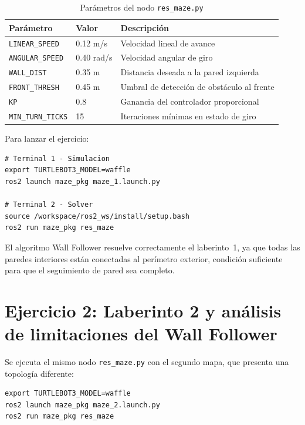 \begin{table}[H]
\centering
\begin{tabular}{lll}
\toprule
\textbf{Parámetro}      & \textbf{Valor} & \textbf{Descripción} \\
\midrule
\texttt{LINEAR\_SPEED}  & 0.12 m/s  & Velocidad lineal de avance \\
\texttt{ANGULAR\_SPEED} & 0.40 rad/s & Velocidad angular de giro \\
\texttt{WALL\_DIST}     & 0.35 m    & Distancia deseada a la pared izquierda \\
\texttt{FRONT\_THRESH}  & 0.45 m    & Umbral de detección de obstáculo al frente \\
\texttt{KP}             & 0.8       & Ganancia del controlador proporcional \\
\texttt{MIN\_TURN\_TICKS} & 15      & Iteraciones mínimas en estado de giro \\
\bottomrule
\end{tabular}
\caption{Parámetros del nodo \texttt{res\_maze.py}}
\end{table}

Para lanzar el ejercicio:

\begin{lstlisting}[style=bash]
# Terminal 1 - Simulacion
export TURTLEBOT3_MODEL=waffle
ros2 launch maze_pkg maze_1.launch.py

# Terminal 2 - Solver
source /workspace/ros2_ws/install/setup.bash
ros2 run maze_pkg res_maze
\end{lstlisting}

El algoritmo Wall Follower resuelve correctamente el laberinto~1, ya que todas las
paredes interiores están conectadas al perímetro exterior, condición suficiente para
que el seguimiento de pared sea completo.

\section{Ejercicio 2: Laberinto 2 y análisis de limitaciones del Wall Follower}

Se ejecuta el mismo nodo \texttt{res\_maze.py} con el segundo mapa, que presenta una
topología diferente:

\begin{lstlisting}[style=bash]
export TURTLEBOT3_MODEL=waffle
ros2 launch maze_pkg maze_2.launch.py
ros2 run maze_pkg res_maze
\end{lstlisting}

